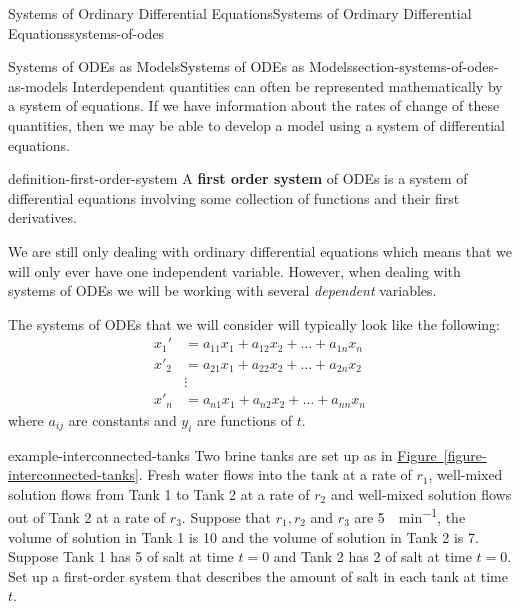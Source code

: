 \documentclass[oneside,10pt,]{book}
\newcommand{\terminology}[1]{\textbf{#1}}
\numberwithin{equation}{section}
\newcommand{\amp}{&}
\begin{document}
\begin{chapterptx}{Systems of Ordinary Differential Equations}{}{Systems of Ordinary Differential Equations}{}{}{systems-of-odes}
%
%
\typeout{************************************************}
\typeout{************************************************}
%
\begin{sectionptx}{Systems of ODEs as Models}{}{Systems of ODEs as Models}{}{}{section-systems-of-odes-as-models}
\hypertarget{p-297}{}%
Interdependent quantities can often be represented mathematically by a system of equations. If we have information about the rates of change of these quantities, then we may be able to develop a model using a system of differential equations.%
\begin{definition}{}{definition-first-order-system}%
\hypertarget{p-298}{}%
A \terminology{first order system} of ODEs is a system of differential equations involving some collection of functions and their first derivatives.%
\end{definition}
\hypertarget{p-299}{}%
We are still only dealing with ordinary differential equations which means that we will only ever have one independent variable. However, when dealing with systems of ODEs we will be working with several \emph{dependent} variables.%
\par
\hypertarget{p-300}{}%
The systems of ODEs that we will consider will typically look like the following:%
\begin{align*}
x_{1}'  \amp=  a_{11}x_{1} +a_{12}x_{2}+\dots+a_{1n}x_{n}\\
x'_{2}  \amp=  a_{21}x_{1} + a_{22}x_{2} + \dots + a_{2n}x_{2}\\
\amp\vdots\\
x'_{n}  \amp=  a_{n1}x_{1} + a_{n2}x_{2} + \dots + a_{nn}x_{n}
\end{align*}
where \(a_{ij}\) are constants and \(y_{i}\) are functions of \(t\).%
\begin{example}{}{example-interconnected-tanks}%
\hypertarget{p-301}{}%
Two brine tanks are set up as in \hyperref[figure-interconnected-tanks]{Figure~\ref{figure-interconnected-tanks}}. Fresh water flows into the tank at a rate of \(r_{1}\), well-mixed solution flows from Tank 1 to Tank 2 at a rate of \(r_{2}\) and well-mixed solution flows out of Tank 2 at a rate of \(r_{3}\). Suppose that \(r_{1}, r_{2}\) and  \(r_{3}\) are \SI{5}{\gallon\per\minute}, the volume of solution in Tank 1 is \SI{10}{\gallon} and the volume of solution in Tank 2 is \SI{7}{\gallon}. Suppose Tank 1 has \SI{5}{\pound} of salt at time \(t=0\) and Tank 2 has \SI{2}{\pound} of salt at time \(t=0\). Set up a first-order system that describes the amount of salt in each tank at time \(t\).%

\end{example}
\end{sectionptx}
\end{chapterptx}
\end{document}
